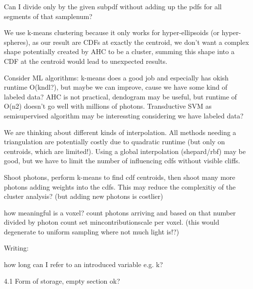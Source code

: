 Can I divide only by the given subpdf without adding up the pdfs for all segments of that samplenum?

We use k-means clustering because it only works for hyper-ellipsoids (or hyper-spheres), as our result are CDFs at exactly the centroid, we don't want a complex shape potentially created by AHC to be a cluster, summing this shape into a CDF at the centroid would lead to unexpected results.

Consider ML algorithms: k-means does a good job and especially has okish runtime O(kndl?), but maybe we can improve, cause we have some kind of labeled data? AHC is not practical, dendogram may be useful, but runtime of O(n2) doesn't go well with millions of photons. Transductive SVM as semisupervised algorithm may be interessting considering we have labeled data? 

We are thinking about different kinds of interpolation. All methods needing a triangulation are potentially costly due to quadratic runtime (but only on centroids, which are limited!). Using a global interpolation (shepard/rbf) may be good, but we have to limit the number of influencing cdfs without visible cliffs.

Shoot photons, perform k-means to find cdf centroids, then shoot many more photons adding weights into the cdfs. This may reduce the complexitiy of the cluster analysis? (but adding new photons is costlier)

how meaningful is a voxel? count photons arriving and based on that number divided by photon count set mincontributionscale per voxel. (this would degenerate to uniform sampling where not much light is!?)



Writing:

how long can I refer to an introduced variable e.g. k?

4.1 Form of storage, empty section ok?